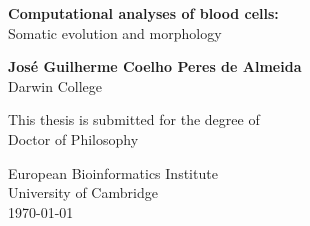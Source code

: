 \begin{titlepage}
   \begin{center}
       \vspace*{1cm}
       {\huge \textbf{Computational analyses of blood cells:}}\\
       \vspace{0.3cm}
       {\huge Somatic evolution and morphology}

       \vspace{1.5cm}

       \textbf{José Guilherme Coelho Peres de Almeida}\\
       Darwin College
       \vfill
            
       This thesis is submitted for the degree of\\
       Doctor of Philosophy
            
       \vspace{0.8cm}
            
       European Bioinformatics Institute\\
       University of Cambridge\\
       \today
            
   \end{center}
\end{titlepage}